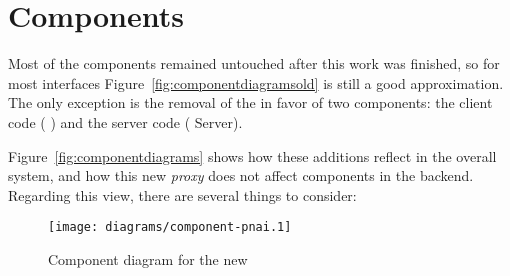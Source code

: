 \section{Components} %
\label{sec:components}

Most of the components remained untouched after this work was finished, so for most interfaces Figure~\vref{fig:componentdiagramsold} is still a good approximation.
The only exception is the removal of the  in favor of two  components: the client code ( ) and the server code ( Server).

Figure~\vref{fig:componentdiagrams} shows how these additions reflect in the overall system, and how this new \emph{proxy} does not affect components in the backend.
Regarding this view, there are several things to consider:

\begin{figure}[htbp]
  \centering
    \texttt{[image: diagrams/component-pnai.1]}
  \caption{Component diagram for the new }
  \label{fig:componentdiagrams}
\end{figure}

